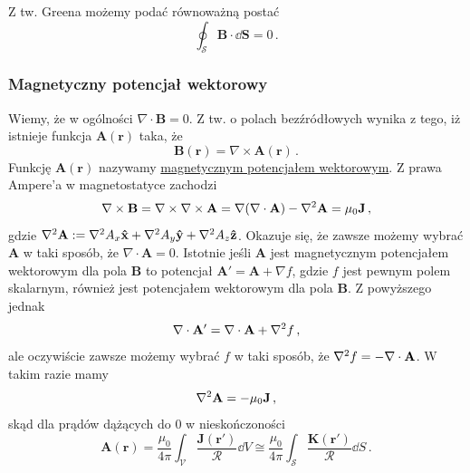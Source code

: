 \documentclass[../main.tex]{subfiles}
\begin{document}
Z tw. Greena możemy podać równoważną postać
\begin{equation*}
    \oint_\mathcal{S}\mathbf{B}\cdot\dd{\mathbf{S}}=0\,.
\end{equation*}


\subsubsection{Magnetyczny potencjał wektorowy}
Wiemy, że w ogólności \(\nabla\cdot\mathbf{B}=0\). Z tw. o polach bezźródłowych wynika z tego, iż
istnieje funkcja \(\mathbf{A}(\mathbf{r})\) taka, że
\begin{equation*}
    \mathbf{B}(\mathbf{r})=\nabla\times\mathbf{A}(\mathbf{r})\,.
\end{equation*}
Funkcję \(\mathbf{A}(\mathbf{r})\) nazywamy \underline{magnetycznym potencjałem wektorowym}. Z prawa
Ampere'a w magnetostatyce zachodzi
\begin{equation*}
    \nabla\times\mathbf{B}=\nabla\times\nabla\times\mathbf{A}=\nabla(\nabla\cdot\mathbf{A})-\laplacian\mathbf{A}=\mu_0\mathbf{J}\,,
\end{equation*}
gdzie \(\laplacian\mathbf{A}:=\laplacian A_x\mathbf{\hat{x}}+\laplacian
A_y\mathbf{\hat{y}}+\laplacian A_z\mathbf{\hat{z}}\). Okazuje się, że zawsze możemy wybrać
\(\mathbf{A}\) w taki sposób, że \(\nabla\cdot\mathbf{A}=0\). Istotnie jeśli \(\mathbf{A}\) jest
magnetycznym potencjałem wektorowym dla pola \(\mathbf{B}\) to potencjał
\(\mathbf{A}'=\mathbf{A}+\nabla f\), gdzie \(f\) jest pewnym polem skalarnym, również jest
potencjałem wektorowym dla pola \(\mathbf{B}\). Z powyższego jednak
\begin{equation*}
    \nabla\cdot\mathbf{A}'=\nabla\cdot\mathbf{A}+\laplacian f\,,
\end{equation*}
ale oczywiście zawsze możemy wybrać \(f\) w taki sposób, że \(\laplacian f=-\nabla\cdot\mathbf{A}\).
W takim razie mamy
\begin{equation*}
    \laplacian\mathbf{A}=-\mu_0\mathbf{J}\,,
\end{equation*}
skąd dla prądów dążących do 0 w nieskończoności
\begin{equation*}
    \mathbf{A}(\mathbf{r})=\frac{\mu_0}{4\pi}\int_\mathcal{V}\frac{\mathbf{J}(\mathbf{r}')}{\mathcal{R}}\dd{V}\cong\frac{\mu_0}{4\pi}\int_\mathcal{S}\frac{\mathbf{K}(\mathbf{r}')}{\mathcal{R}}\dd{S}\,.
\end{equation*}
\end{document}
